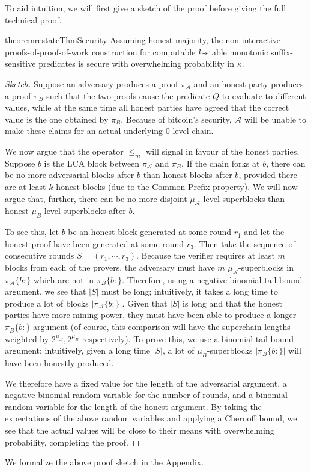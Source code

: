 To aid intuition, we will first give a sketch of the proof before giving the
full technical proof.

\begin{restatable}[Security]{theorem}{restateThmSecurity}
    \label{thm.security}
    Assuming honest majority, the non-interactive proofs-of-proof-of-work
    construction for computable $k$-stable monotonic suffix-sensitive predicates
    is secure with overwhelming probability in $\kappa$.
\end{restatable}
\begin{proof}[Sketch]
Suppose an adversary produces a proof $\pi_\mathcal{A}$ and an honest
party produces a proof $\pi_B$ such that the two proofs cause the predicate $Q$
to evaluate to different values, while at the same time all honest parties have
agreed that the correct value is the one obtained by $\pi_B$. Because of
bitcoin's security, $\mathcal{A}$ will be unable to make these claims for an
actual underlying 0-level chain.

We now argue that the operator $\leq_m$ will
signal in favour of the honest parties.
Suppose $b$ is the LCA block between $\pi_\mathcal{A}$ and $\pi_B$. If the chain
forks at $b$, there can be no more adversarial blocks after $b$ than honest
blocks after $b$, provided there are at least $k$ honest blocks (due to the
Common Prefix property). We will now argue that, further, there can be no more
disjoint $\mu_\mathcal{A}$-level superblocks than honest $\mu_B$-level
superblocks after $b$.

To see this, let $b$ be an honest block generated at some round $r_1$ and let
the honest proof have been generated at some round $r_3$. Then take the sequence
of consecutive rounds $S = (r_1, \cdots, r_3)$. Because the verifier requires at
least $m$ blocks from each of the provers, the adversary must have $m$
$\mu_\mathcal{A}$-superblocks in $\pi_\mathcal{A}\{b:\}$ which are not in
$\pi_B\{b:\}$. Therefore, using a negative binomial tail bound argument, we see
that $|S|$ must be long; intuitively, it takes a long time to produce a lot of
blocks $|\pi_\mathcal{A}\{b:\}|$. Given that $|S|$ is long and that the honest
parties have more mining power, they must have been able to produce a longer
$\pi_B\{b:\}$ argument (of course, this comparison will have the superchain
lengths weighted by $2^{\mu_\mathcal{A}}, 2^{\mu_B}$ respectively). To prove
this, we use a binomial tail bound argument; intuitively, given a long time
$|S|$, a lot of $\mu_B$-superblocks $|\pi_B\{b:\}|$ will have been honestly
produced.

We therefore have a fixed value for the length of the adversarial argument, a
negative binomial random variable for the number of rounds, and a binomial
random variable for the length of the honest argument. By taking the
expectations of the above random variables and applying a Chernoff bound, we see
that the actual values will be close to their means with overwhelming
probability, completing the proof.
\Qed
\end{proof}

We formalize the above proof sketch in the Appendix.
